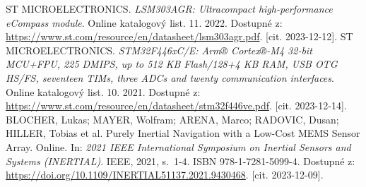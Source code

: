 \begin{thebibliography}{22}
ST MICROELECTRONICS. \textit{LSM303AGR: Ultracompact high-performance eCompass module}. Online katalogový list. 11. 2022. Dostupné z: \url{https://www.st.com/resource/en/datasheet/lsm303agr.pdf}. [cit. 2023-12-12].
ST MICROELECTRONICS. \textit{STM32F446xC/E: Arm® Cortex®-M4 32-bit MCU+FPU, 225 DMIPS, up to 512 KB Flash/128+4 KB RAM, USB OTG HS/FS, seventeen TIMs, three ADCs and twenty communication interfaces}. Online katalogový list. 10. 2021. Dostupné z: \url{https://www.st.com/resource/en/datasheet/stm32f446ve.pdf}. [cit. 2023-12-14].
BLOCHER, Lukas; MAYER, Wolfram; ARENA, Marco; RADOVIC, Dusan; HILLER, Tobias et al. Purely Inertial Navigation with a Low-Cost MEMS Sensor Array. Online. In: \textit{2021 IEEE International Symposium on Inertial Sensors and Systems (INERTIAL)}. IEEE, 2021, s.~1-4. ISBN 978-1-7281-5099-4. Dostupné z: \url{https://doi.org/10.1109/INERTIAL51137.2021.9430468}. [cit. 2023-12-09].

\end{thebibliography}